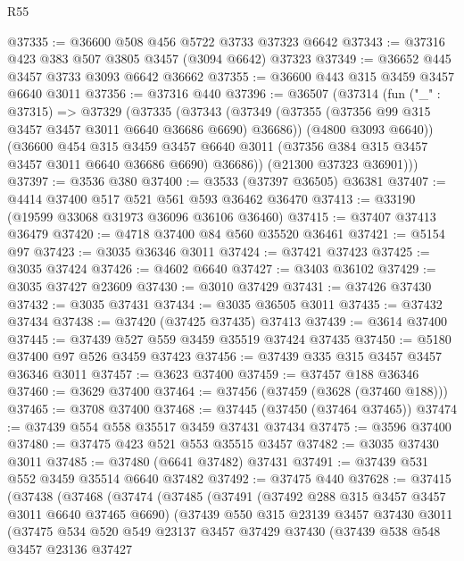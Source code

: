 \begin{lexlean}{R55}
\begin{coremodule}
@37335 := @36600 @508 @456 @5722 @3733 @37323 @6642
@37343 := @37316 @423 @383 @507 @3805 @3457 (@3094 @6642) @37323
@37349 := @36652 @445 @3457 @3733 @3093 @6642 @36662
@37355 := @36600 @443 @315 @3459 @3457 @6640 @3011
@37356 := @37316 @440
@37396 := @36507
    (@37314
      (fun ("_" : @37315) =>
      @37329
        (@37335
          (@37343
            (@37349 (@37355 (@37356 @99 @315 @3457 @3457 @3011 @6640 @36686 @6690) @36686))
            (@4800 @3093 @6640))
          (@36600
            @454
            @315
            @3459
            @3457
            @6640
            @3011
            (@37356 @384 @315 @3457 @3457 @3011 @6640 @36686 @6690)
            @36686))
        (@21300 @37323 @36901)))
@37397 := @3536 @380
@37400 := @3533 (@37397 @36505) @36381
@37407 := @4414 @37400 @517 @521 @561 @593 @36462 @36470
@37413 := @33190 (@19599 @33068 @31973 @36096 @36106 @36460)
@37415 := @37407 @37413 @36479
@37420 := @4718 @37400 @84 @560 @35520 @36461
@37421 := @5154 @97
@37423 := @3035 @36346 @3011
@37424 := @37421 @37423
@37425 := @3035 @37424
@37426 := @4602 @6640
@37427 := @3403 @36102
@37429 := @3035 @37427 @23609
@37430 := @3010 @37429
@37431 := @37426 @37430
@37432 := @3035 @37431
@37434 := @3035 @36505 @3011
@37435 := @37432 @37434
@37438 := @37420 (@37425 @37435) @37413
@37439 := @3614 @37400
@37445 := @37439 @527 @559 @3459 @35519 @37424 @37435
@37450 := @5180 @37400 @97 @526 @3459 @37423
@37456 := @37439 @335 @315 @3457 @3457 @36346 @3011
@37457 := @3623 @37400
@37459 := @37457 @188 @36346
@37460 := @3629 @37400
@37464 := @37456 (@37459 (@3628 (@37460 @188)))
@37465 := @3708 @37400
@37468 := @37445 (@37450 (@37464 @37465))
@37474 := @37439 @554 @558 @35517 @3459 @37431 @37434
@37475 := @3596 @37400
@37480 := @37475 @423 @521 @553 @35515 @3457
@37482 := @3035 @37430 @3011
@37485 := @37480 (@6641 @37482) @37431
@37491 := @37439 @531 @552 @3459 @35514 @6640 @37482
@37492 := @37475 @440
@37628 := @37415
    (@37438
      (@37468
        (@37474
          (@37485
            (@37491
              (@37492 @288 @315 @3457 @3457 @3011 @6640 @37465 @6690)
              (@37439
                @550
                @315
                @23139
                @3457
                @37430
                @3011
                (@37475
                  @534
                  @520
                  @549
                  @23137
                  @3457
                  @37429
                  @37430
                  (@37439
                    @538
                    @548
                    @3457
                    @23136
                    @37427

\end{coremodule}
\end{lexlean}
